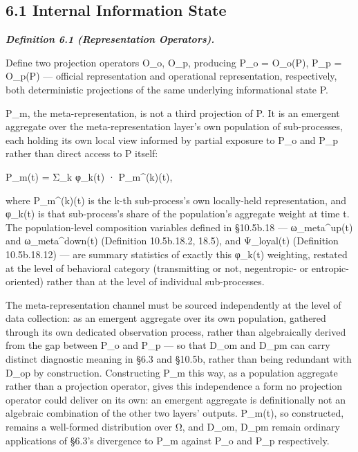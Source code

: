 \documentclass[
]{article}
\begin{document}
\hypertarget{internal-information-state}{%
\subsection{6.1 Internal Information
State}\label{internal-information-state}}

\emph{\textbf{Definition 6.1 (Representation Operators).}}

Define two projection operators O\_o, O\_p, producing P\_o = O\_o(P),
P\_p = O\_p(P) --- official representation and operational
representation, respectively, both deterministic projections of the same
underlying informational state P.

P\_m, the meta-representation, is not a third projection of P. It is an
emergent aggregate over the meta-representation layer's own population
of sub-processes, each holding its own local view informed by partial
exposure to P\_o and P\_p rather than direct access to P itself:

P\_m(t) = Σ\_k φ\_k(t) · P\_m\^{}(k)(t),

where P\_m\^{}(k)(t) is the k-th sub-process's own locally-held
representation, and φ\_k(t) is that sub-process's share of the
population's aggregate weight at time t. The population-level
composition variables defined in §10.5b.18 --- ω\_meta\^{}up(t) and
ω\_meta\^{}down(t) (Definition 10.5b.18.2, 18.5), and Ψ\_loyal(t)
(Definition 10.5b.18.12) --- are summary statistics of exactly this
φ\_k(t) weighting, restated at the level of behavioral category
(transmitting or not, negentropic- or entropic-oriented) rather than at
the level of individual sub-processes.

The meta-representation channel must be sourced independently at the
level of data collection: as an emergent aggregate over its own
population, gathered through its own dedicated observation process,
rather than algebraically derived from the gap between P\_o and P\_p ---
so that D\_om and D\_pm can carry distinct diagnostic meaning in §6.3
and §10.5b, rather than being redundant with D\_op by construction.
Constructing P\_m this way, as a population aggregate rather than a
projection operator, gives this independence a form no projection
operator could deliver on its own: an emergent aggregate is
definitionally not an algebraic combination of the other two layers'
outputs. P\_m(t), so constructed, remains a well-formed distribution
over Ω, and D\_om, D\_pm remain ordinary applications of §6.3's
divergence to P\_m against P\_o and P\_p respectively.
\end{document}
